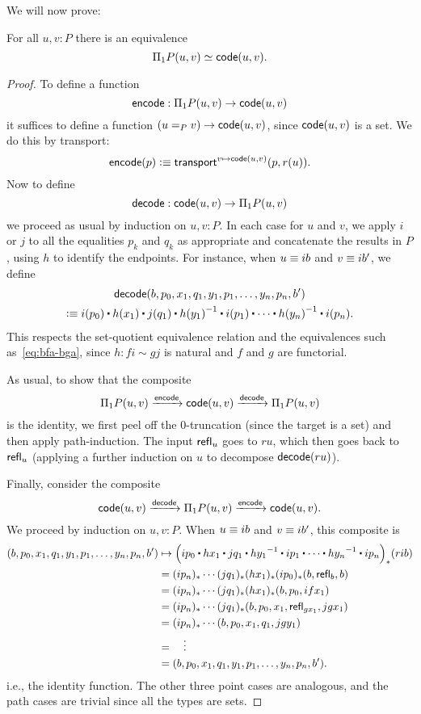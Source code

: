 We will now prove:
\begin{thm}\label{thm:naive-van-kampen}
  For all $u,v:P$ there is an equivalence
  \[ \Pi_1P(u,v) \simeq \mathsf{code}(u,v). \]
\end{thm}
\begin{proof}

To define a function
\[ \mathsf{encode} : \Pi_1P(u,v) \to \mathsf{code}(u,v) \]
it suffices to define a function $(u=_P v) \to \mathsf{code}(u,v)$,
since $\mathsf{code}(u,v)$ is a set.
We do this by transport:
\[\mathsf{encode}(p) \vcentcolon\equiv \mathsf{transport}^{v\mapsto \mathsf{code}(u,v)}(p,r(u)).\]
Now to define
\[ \mathsf{decode}: \mathsf{code}(u,v) \to \Pi_1P(u,v) \]
we proceed as usual by induction on $u,v:P$.
In each case for $u$ and $v$, we apply $i$ or $j$ to all the equalities $p_k$ and $q_k$ as appropriate and concatenate the results in $P$, using $h$ to identify the endpoints.
For instance, when $u\equiv ib$ and $v\equiv ib'$, we define
\begin{multline}\label{eq:decode}
 \decode(b, p_0, x_1, q_1, y_1, p_1, \dots, y_n, p_n, b')\\
 \defeq i(p_0)\ct h(x_1) \ct j(q_1) \ct \opp{h(y_1)} \ct i(p_1) \ct \cdots \ct \opp{h(y_n)}\ct i(p_n).
\end{multline}
This respects the set-quotient equivalence relation and the equivalences such as~\eqref{eq:bfa-bga}, since $h: fi \sim gj$ is natural and $f$ and $g$ are functorial.

As usual, to show that the composite
\[ \Pi_1P(u,v) \xrightarrow{\mathsf{encode}} \mathsf{code}(u,v) \xrightarrow{\mathsf{decode}} \Pi_1P(u,v) \]
is the identity, we first peel off the 0-truncation (since the target is a set) and then apply path-induction.
The input $\mathsf{refl}_{u}$ goes to $ru$, which then goes back to $\mathsf{refl}_{u}$ (applying a further induction on $u$ to decompose $\mathsf{decode}(ru)$).

Finally, consider the composite
\[  \mathsf{code}(u,v) \xrightarrow{\mathsf{decode}} \Pi_1P(u,v) \xrightarrow{\mathsf{encode}} \mathsf{code}(u,v). \]
We proceed by induction on $u,v:P$.
When $u\equiv ib$ and $v\equiv ib'$, this composite is
\[\begin{aligned}
(b, p_0, x_1, q_1, y_1, p_1, \dots, y_n, p_n, b')
  &\mapsto \Big(ip_0\ct hx_1 \ct jq_1 \ct \opp{hy_1} \ct ip_1 \ct \cdots \ct \opp{hy_n}\ct ip_n\Big)_*(rib)\\
  &= (ip_n)_* \cdots(jq_1)_* (hx_1)_*(ip_0)_*(b,\refl{b},b)\\
  &= (ip_n)_* \cdots(jq_1)_* (hx_1)_*(b,p_0,ifx_1)\\
  &= (ip_n)_* \cdots(jq_1)_* (b,p_0,x_1,\refl{gx_1},jgx_1)\\
  &= (ip_n)_* \cdots (b,p_0,x_1,q_1,jgy_1)\\
  &= \quad\vdots\\
  &= (b, p_0, x_1, q_1, y_1, p_1, \dots, y_n, p_n, b').
\end{aligned}\]
i.e., the identity function.
The other three point cases are analogous, and the path cases are trivial since all the types are sets.
\end{proof}

